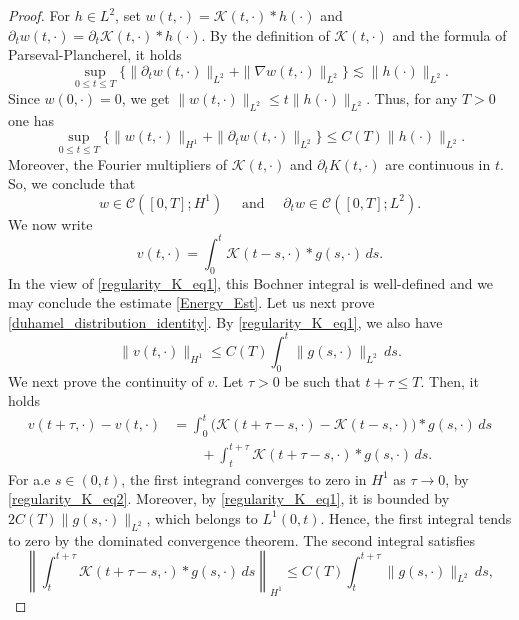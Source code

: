 \documentclass[11pt,reqno]{amsart}
\begin{document}
	\begin{proof}
		For $h\in L^2$, set $w(t,\cdot)=\mathcal K(t,\cdot)\ast h(\cdot)$ and $\partial_tw(t,\cdot)=\partial_t\mathcal K(t,\cdot)\ast h(\cdot)$. By the definition of $\mathcal K(t,\cdot)$ and the formula of Parseval-Plancherel, it holds
		\begin{equation}\label{uniformbound_H_1_and_t}
			\sup_{0\leq t\leq T}\big\{\|\partial_tw(t,\cdot)\|_{L^2}+\|\nabla w(t,\cdot)\|_{L^2}\big\}\lesssim \|h(\cdot)\|_{L^2}.
		\end{equation}
		Since $w(0,\cdot)=0$, we get $\|w(t,\cdot)\|_{L^2}\leq t\|h(\cdot)\|_{L^2}$. Thus, for any $T>0$ one has
		\begin{equation}\label{regularity_K_eq1}
			\sup_{0\leq t\leq T}\big\{\|w(t,\cdot)\|_{H^1}+\|\partial_tw(t,\cdot)\|_{L^2}
			\big\}\leq C(T)\|h(\cdot)\|_{L^2}.
		\end{equation}
		Moreover, the Fourier multipliers of $\mathcal{K}(t,\cdot)$ and $\partial_t K(t,\cdot)$ are continuous in $t$. So, we conclude that
		\begin{equation}\label{regularity_K_eq2}
			w\in \mathcal{C}([0,T];H^1) \quad \text{ and }\quad
			\partial_tw \in \mathcal{C}([0,T];L^2).
		\end{equation}
		We now write
		\[
		v(t,\cdot)=\int_0^t\mathcal{K}(t-s,\cdot)\ast g(s,\cdot)\,ds.
		\]
		In the view of \eqref{regularity_K_eq1}, this Bochner integral is well-defined and we may conclude the estimate \eqref{Energy_Est}. Let us next prove \eqref{duhamel_distribution_identity}. By \eqref{regularity_K_eq1}, we also have
		\[
		\|v(t,\cdot)\|_{H^1}
		\leq C(T)\int_0^t \|g(s,\cdot)\|_{L^2}\,ds.
		\]
		We next prove the continuity of $v$. Let $\tau>0$ be such that $t+\tau\leq T$. Then, it holds
		\[
		\begin{aligned}
			v(t+\tau,\cdot)-v(t,\cdot) &=\int_0^t
			\bigl(\mathcal{K}(t+\tau-s,\cdot)-\mathcal{K}(t-s,\cdot)\bigr)\ast g(s,\cdot)\,ds \\
			&\qquad +\int_t^{t+\tau}\mathcal{K}(t+\tau-s,\cdot)\ast g(s,\cdot)\,ds.
		\end{aligned}
		\]
		For a.e $s\in(0,t)$, the first integrand converges to zero in $H^1$ as $\tau\to0$, by
		\eqref{regularity_K_eq2}. Moreover, by
		\eqref{regularity_K_eq1}, it is bounded by $2C(T)\|g(s,\cdot)\|_{L^2}$, which belongs to $L^1(0,t)$. Hence, the first integral tends to zero by the dominated convergence theorem. The second integral satisfies
		\[
		\left\|\int_t^{t+\tau}\mathcal{K}(t+\tau-s,\cdot)\ast g(s,\cdot)\,ds\right\|_{H^1}\leq C(T)\int_t^{t+\tau}\| g(s,\cdot)\|_{L^2}\,ds,
\]
\end{proof}
\end{document}
